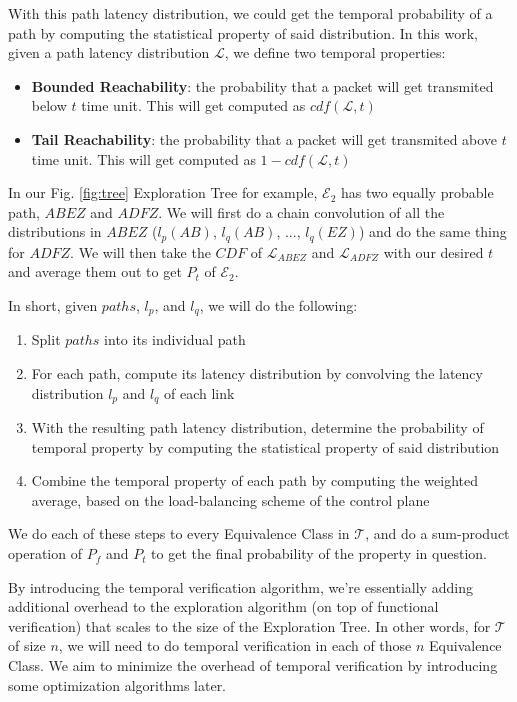 \documentclass[10pt,sigconf,letterpaper,anonymous,nonacm]{acmart}
\begin{document}
With this path latency distribution, we could get the temporal probability of a 
path by computing the statistical property of said distribution.
In this work, given a path latency distribution $\mathcal{L}$, we define two temporal 
properties:
\begin{itemize}
    \item \textbf{Bounded Reachability}: the probability that a packet will get 
        transmited below $t$ time unit. This will get computed as $cdf(\mathcal{L}, t)$
    \item \textbf{Tail Reachability}: the probability that a packet will get 
        transmited above $t$ time unit. This will get computed as 
        $1 - cdf(\mathcal{L}, t)$
\end{itemize}

In our Fig. \ref{fig:tree} Exploration Tree for example, $\mathcal{E}_2$ has two 
equally probable path, $ABEZ$ and $ADFZ$.
We will first do a chain convolution of all the distributions in $ABEZ$ ($l_p(AB)$, 
$l_q(AB)$, ..., $l_q(EZ)$) and do the same thing for $ADFZ$.
We will then take the $CDF$ of $\mathcal{L}_{ABEZ}$ and $\mathcal{L}_{ADFZ}$ with our 
desired $t$ and average them out to get $P_t$ of $\mathcal{E}_2$. 

In short, given $paths$, $l_p$, and $l_q$, we will do the following:
\begin{enumerate}
    \item Split $paths$ into its individual path
    \item For each path, compute its latency distribution by convolving the latency distribution 
        $l_p$ and $l_q$ of each link
    \item With the resulting path latency distribution, determine the probability of temporal 
        property by computing the statistical property of said distribution
    \item Combine the temporal property of each path by computing the weighted average, based 
        on the load-balancing scheme of the control plane
\end{enumerate}

We do each of these steps to every Equivalence Class in $\mathcal{T}$, and do a sum-product operation 
of $P_f$ and $P_t$ to get the final probability of the property in question.

By introducing the temporal verification algorithm, we're essentially adding additional overhead to the 
exploration algorithm (on top of functional verification) that scales to the size of the Exploration Tree.
In other words, for $\mathcal{T}$ of size $n$, we will need to do temporal verification in each of 
those $n$ Equivalence Class.
We aim to minimize the overhead of temporal verification by introducing some optimization algorithms
later.
\end{document}
